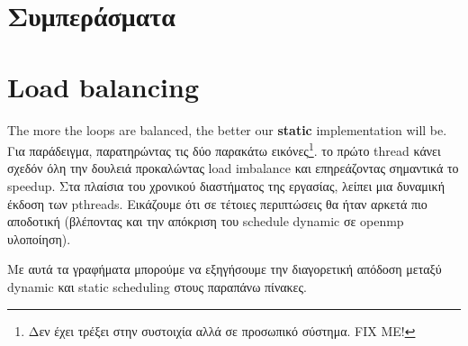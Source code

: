 \documentclass[12pt, a4paper]{article}
\begin{document}
\section{Συμπεράσματα}

\section{Load balancing}


The more the loops are balanced, the better our \textbf{static} implementation will be. Για παράδειγμα, παρατηρώντας τις δύο παρακάτω εικόνες\footnote{Δεν έχει τρέξει στην συστοιχία αλλά σε προσωπικό σύστημα. FIX ME!}. το πρώτο thread κάνει σχεδόν όλη την δουλειά προκαλώντας load imbalance και επηρεάζοντας σημαντικά το speedup. Στα πλαίσια του χρονικού διαστήματος της εργασίας, λείπει μια δυναμική έκδοση των pthreads. Εικάζουμε ότι σε τέτοιες περιπτώσεις θα ήταν αρκετά πιο αποδοτική (βλέποντας και την απόκριση του schedule dynamic σε openmp υλοποίηση).

Με αυτά τα γραφήματα μπορούμε να εξηγήσουμε την διαγορετική απόδοση μεταξύ dynamic και static scheduling στους παραπάνω πίνακες.
\end{document}
